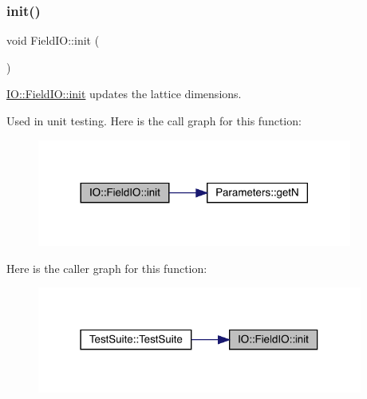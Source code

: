 \subsubsection{\texorpdfstring{init()}{init()}}
{\footnotesize\ttfamily void Field\+I\+O\+::init (\begin{DoxyParamCaption}{ }\end{DoxyParamCaption})\hspace{0.3cm}{\ttfamily [static]}}



\mbox{\hyperlink{class_i_o_1_1_field_i_o_a9093930584128c73a63fe8015bff9b38}{I\+O\+::\+Field\+I\+O\+::init}} updates the lattice dimensions. 

Used in unit testing. Here is the call graph for this function\+:
\nopagebreak
\begin{figure}[H]
\begin{center}
\leavevmode
\includegraphics[width=293pt]{class_i_o_1_1_field_i_o_a9093930584128c73a63fe8015bff9b38_cgraph}
\end{center}
\end{figure}
Here is the caller graph for this function\+:
\nopagebreak
\begin{figure}[H]
\begin{center}
\leavevmode
\includegraphics[width=303pt]{class_i_o_1_1_field_i_o_a9093930584128c73a63fe8015bff9b38_icgraph}
\end{center}
\end{figure}
\mbox{\label{class_i_o_1_1_field_i_o_af23fb6e02a6bd1cafd5be4acacbf848e}} 
